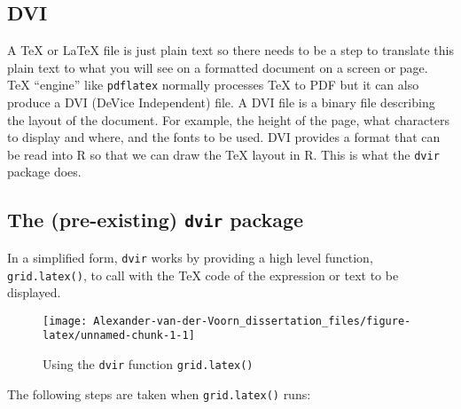 \documentclass[]{article}
\newenvironment{Shaded}{\begin{snugshade}}{\end{snugshade}}
\newcommand{\KeywordTok}[1]{\textcolor[rgb]{0.13,0.29,0.53}{\textbf{#1}}}
\newcommand{\CharTok}[1]{\textcolor[rgb]{0.31,0.60,0.02}{#1}}
\newcommand{\StringTok}[1]{\textcolor[rgb]{0.31,0.60,0.02}{#1}}
\newcommand{\NormalTok}[1]{#1}
\begin{document}
\subsection{DVI}\label{dvi}

A \TeX{} or \LaTeX{} file is just plain text so there needs to be a step
to translate this plain text to what you will see on a formatted
document on a screen or page. \TeX{} ``engine'' like \texttt{pdflatex}
normally processes \TeX{} to PDF but it can also produce a DVI (DeVice
Independent) file. A DVI file is a binary file describing the layout of
the document. For example, the height of the page, what characters to
display and where, and the fonts to be used. DVI provides a format that
can be read into R so that we can draw the \TeX{} layout in R. This is
what the \texttt{dvir} package does.

\subsection{\texorpdfstring{The (pre-existing) \texttt{dvir}
package}{The (pre-existing) dvir package}}\label{dvirDesc}

In a simplified form, \texttt{dvir} works by providing a high level
function, \texttt{grid.latex()}, to call with the \TeX{} code of the
expression or text to be displayed.

\begin{Shaded}
\end{Shaded}

\begin{figure}

{\centering \texttt{[image: Alexander-van-der-Voorn\_dissertation\_files/figure-latex/unnamed-chunk-1-1]} 

}

\caption{Using the \texttt{dvir} function \texttt{grid.latex()}}\label{fig:unnamed-chunk-1}
\end{figure}

The following steps are taken when \texttt{grid.latex()} runs:
\end{document}
